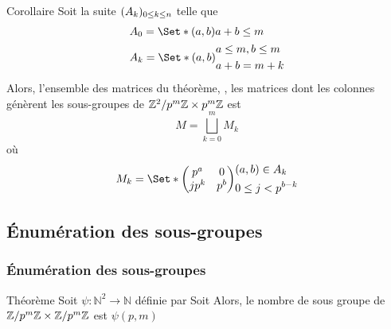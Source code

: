 \documentclass[10pt]{beamer}
\newcommand*{\pmZpmZ }{p^m\Z \x p^m\Z}
\newcommand*{\ZZpmZ}{\Z^2/\pmZpmZ}
\newcommand{\ZpmZ}{\Z/p^m\Z}
\newcommand{\ZZpm}{\ZpmZ \x \ZpmZ}
\begin{document}
\begin{frame}
    \begin{block}{Corollaire}
        Soit la suite $(A_{k})_{0 \le k \le n}$ telle que
        \begin{equation*}
            \begin{split}
                &A_0 = \Set*{(a,b)}{ a + b \le m}\\
                &A_k = \Set*{
                    (a,b)}{
                    \begin{aligned}
                         & a \le m, b \le m \\
                         & a + b = m + k
                    \end{aligned}
                }
            \end{split}
        \end{equation*}
        Alors, l'ensemble des matrices du théorème, \cad, les matrices dont les colonnes
        génèrent les sous-groupes de $\ZZpmZ$ est
        $$M = \bigsqcup_{k = 0}^mM_k$$
        où
        \begin{equation*}
            M_k = \Set*{
                \begin{pmatrix}
                    p^a  & 0   \\
                    jp^k & p^b
                \end{pmatrix}
            }{
                \begin{aligned}
                     & (a, b) \in A_k      \\
                     & 0 \le j < p^{b - k}
                \end{aligned}
            }
        \end{equation*}
    \end{block}
\end{frame}


\subsection{Énumération des sous-groupes}
\begin{frame}
    \frametitle{Énumération des sous-groupes}
    \begin{alertblock}{Théorème}
        Soit $\psi: \mathbb{N}^2 \rightarrow \mathbb{N}$ définie par
        Soit
        Alors, le nombre de sous groupe de $\ZZpm$ est $\psi(p,m)$
    \end{alertblock}
\end{frame}
\end{document}
